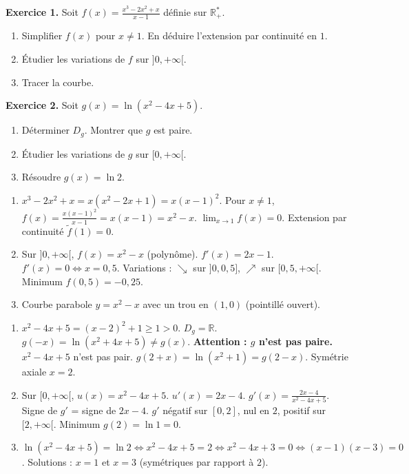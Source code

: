 \documentclass[11pt]{article}
\begin{document}
\begin{exercice}
\textbf{Exercice 1.} Soit $f(x) = \frac{x^3 - 2x^2 + x}{x-1}$ définie sur $\mathbb{R}^*_+$.
\begin{enumerate}
  \item Simplifier $f(x)$ pour $x \neq 1$. En déduire l'extension par continuité en $1$.
  \item Étudier les variations de $f$ sur $]0, +\infty[$.
  \item Tracer la courbe.
\end{enumerate}

\textbf{Exercice 2.} Soit $g(x) = \ln(x^2 - 4x + 5)$.
\begin{enumerate}
  \item Déterminer $D_g$. Montrer que $g$ est paire.
  \item Étudier les variations de $g$ sur $[0, +\infty[$.
  \item Résoudre $g(x) = \ln 2$.
\end{enumerate}
\end{exercice}

\begin{corrige}[Exercice 1]
\begin{enumerate}
  \item $x^3-2x^2+x = x(x^2-2x+1) = x(x-1)^2$.
  Pour $x \neq 1$, $f(x) = \frac{x(x-1)^2}{x-1} = x(x-1) = x^2 - x$.
  $\lim_{x\to 1} f(x) = 0$. Extension par continuité $\tilde{f}(1)=0$.
  \item Sur $]0, +\infty[$, $f(x) = x^2 - x$ (polynôme). $f'(x) = 2x-1$.
  $f'(x)=0 \iff x=0,5$.
  Variations : $\searrow$ sur $]0, 0,5]$, $\nearrow$ sur $[0,5, +\infty[$.
  Minimum $f(0,5) = -0,25$.
  \item Courbe parabole $y=x^2-x$ avec un trou en $(1, 0)$ (pointillé ouvert).
\end{enumerate}
\end{corrige}

\begin{corrige}[Exercice 2]
\begin{enumerate}
  \item $x^2-4x+5 = (x-2)^2+1 \geq 1 > 0$. $D_g = \mathbb{R}$.
  $g(-x) = \ln(x^2+4x+5) \neq g(x)$. \textbf{Attention : $g$ n'est pas paire.}
  $x^2-4x+5$ n'est pas pair. $g(2+x) = \ln(x^2+1) = g(2-x)$. Symétrie axiale $x=2$.
  \item Sur $[0, +\infty[$, $u(x)=x^2-4x+5$. $u'(x)=2x-4$.
  $g'(x) = \frac{2x-4}{x^2-4x+5}$. Signe de $g'$ = signe de $2x-4$.
  $g'$ négatif sur $[0,2]$, nul en $2$, positif sur $[2, +\infty[$.
  Minimum $g(2) = \ln 1 = 0$.
  \item $\ln(x^2-4x+5) = \ln 2 \iff x^2-4x+5 = 2 \iff x^2-4x+3=0 \iff (x-1)(x-3)=0$.
  Solutions : $x=1$ et $x=3$ (symétriques par rapport à $2$).
\end{enumerate}
\end{corrige}
\end{document}
